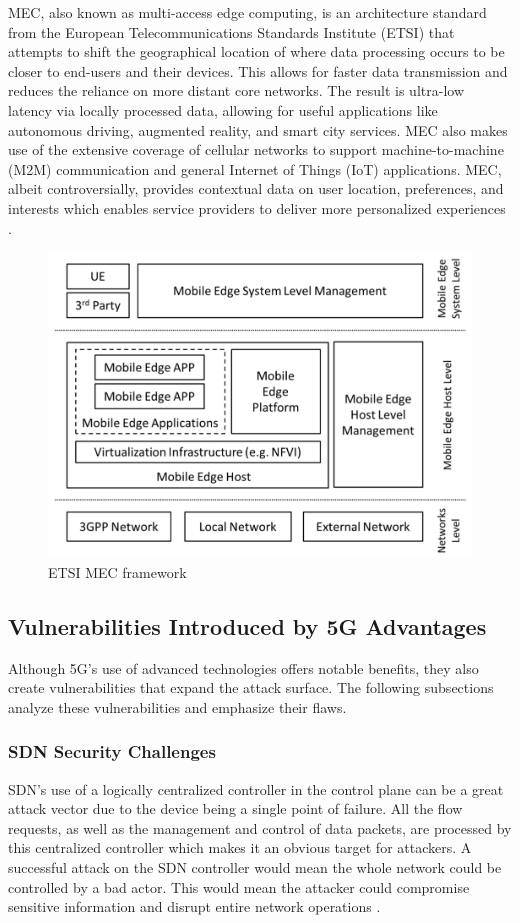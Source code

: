 \documentclass[acmtog]{acmart}
\begin{document}
MEC, also known as multi-access edge computing, is an architecture standard from the European Telecommunications Standards Institute (ETSI) that attempts to shift the geographical location of where data processing occurs to be closer to end-users and their devices. This allows for faster data transmission and reduces the reliance on more distant core networks. The result is ultra-low latency via locally processed data, allowing for useful applications like autonomous driving, augmented reality, and smart city services. \cite{ref6_1} MEC also makes use of the extensive coverage of cellular networks to support machine-to-machine (M2M) communication and general Internet of Things (IoT) applications. MEC, albeit controversially, provides contextual data on user location, preferences, and interests which enables service providers to deliver more personalized experiences \cite{ref6_1}.
\begin{figure}[h]
  \centering
  \includegraphics[width=\linewidth]{mec.png}
  \caption{ETSI MEC framework \cite{ref6_1}}
\end{figure}

\subsection{Vulnerabilities Introduced by 5G Advantages}
Although 5G’s use of advanced technologies offers notable benefits, they also create vulnerabilities that expand the attack surface. The following subsections analyze these vulnerabilities and emphasize their flaws.

\subsubsection{SDN Security Challenges}
SDN’s use of a logically centralized controller in the control plane can be a great attack vector due to the device being a single point of failure. All the flow requests, as well as the management and control of data packets, are processed by this centralized controller which makes it an obvious target for attackers. A successful attack on the SDN controller would mean the whole network could be controlled by a bad actor. This would mean the attacker could compromise sensitive information and disrupt entire network operations \cite{ref6}. \cite{Lee05}
\end{document}
